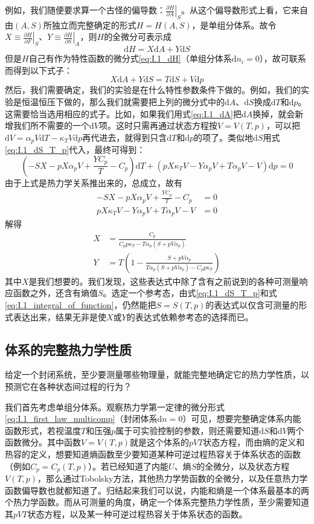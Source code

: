 \documentclass[main.tex]{subfiles}
\begin{document}
例如，我们随便要求算一个古怪的偏导数：$\left.\frac{\partial H}{\partial A}\right|_{S}$。从这个偏导数形式上看，它来自由$\left(A,S\right)$所独立而完整确定的形式$H=H\left(A,S\right)$，是单组分体系。故令$X\equiv\left.\frac{\partial H}{\partial F}\right|_{S}$、$Y\equiv\left.\frac{\partial H}{\partial S}\right|_{A}$，则$H$的全微分可表示成
\[\mathrm{d}H=X\mathrm{d}A+Y\mathrm{d}S\]
但是$H$自己有作为特性函数的微分式\eqref{eq:I.1_dH}（单组分体系$\mathrm{d}n_i=0$），故可联系而得到以下式子：
\[X\mathrm{d}A+Y\mathrm{d}S=T\mathrm{d}S+V\mathrm{d}p\]
然后，我们需要确定，我们的实验是在什么特性参数条件下做的。例如，我们的实验是恒温恒压下做的，那么我们就需要把上列的微分式中的$\mathrm{d}A$、$\mathrm{d}S$换成$\mathrm{d}T$和$\mathrm{d}p$。这需要恰当选用相应的式子。比如，如果我们用式\eqref{eq:I.1_dA}把$\mathrm{d}A$换掉，就会新增我们所不需要的一个$\mathrm{d}V$项。这时只需再通过状态方程按$V=V\left(T,p\right)$，可以把$\mathrm{d}V=\alpha_pV\mathrm{d}T-\kappa_TV\mathrm{d}p$再代进去，就得到只含$\mathrm{d}T$和$\mathrm{d}p$的项了。类似地$\mathrm{d}S$用式\eqref{eq:I.1_dS_T_p}代入，最终可得到：
\[\left(-SX-pX\alpha_pV+\frac{YC_p}{T}-C_p\right)\mathrm{d}T+\left(pX\kappa_TV-Y\alpha_pV+T\alpha_pV-V\right)\mathrm{d}p=0\]
由于上式是热力学关系推出来的，总成立，故有
\begin{align*}
    -SX-pX\alpha_pV+\frac{YC_p}{T}-C_p  & =0 \\
    pX\kappa_TV-Y\alpha_pV+T\alpha_pV-V & =0
\end{align*}
解得
\begin{align*}
    X & =\frac{C_p}{C_p p \kappa_T-T\alpha_p\left(S+pV\alpha_p\right)}                          \\
    Y & =T\left(1-\frac{S+p V \alpha_p}{T\alpha_p\left(S+pV\alpha_p\right)-C_pp\kappa_T}\right)
\end{align*}
其中$X$是我们想要的。我们发现，这些表达式中除了含有之前说到的各种可测量响应函数之外，还含有熵值$S$。选定一个参考态，由式\eqref{eq:I.1_dS_T_p}和式\eqref{eq:I.1_integral_of_function}，仍然能把$S=S\left(T,p\right)$的表达式以仅含可测量的形式表达出来，结果无非是使$X$或$Y$的表达式依赖参考态的选择而已。

\subsection{体系的完整热力学性质}
给定一个封闭系统，至少要测量哪些物理量，就能完整地确定它的热力学性质，以预测它在各种状态间过程的行为？

我们首先考虑单组分体系。观察热力学第一定律的微分形式\eqref{eq:I.1_first_law_multicomp}（封闭体系$\mathrm{d}n=0$）可见，想要完整确定体系内能函数形式，若视温度$T$和压强$p$属于可实验控制的参数，则还需要知道$\mathrm{d}S$和$\mathrm{d}V$两个函数微分。其中函数$V=V\left(T,p\right)$就是这个体系的$pVT$状态方程，而由熵的定义和热容的定义，想要知道熵函数至少要知道某种可逆过程热容关于体系状态的函数（例如$C_p=C_p\left(T,p\right)$）。若已经知道了内能$U$、熵$S$的全微分，以及状态方程$V\left(T,p\right)$，那么通过Tobolsky方法，其他热力学势函数的全微分，以及任意热力学函数偏导数也就都知道了。归结起来我们可以说，内能和熵是一个体系最基本的两个热力学函数。而从可测量的角度，确定一个体系完整热力学性质，至少需要知道其$pVT$状态方程，以及某一种可逆过程热容关于体系状态的函数。
\end{document}
